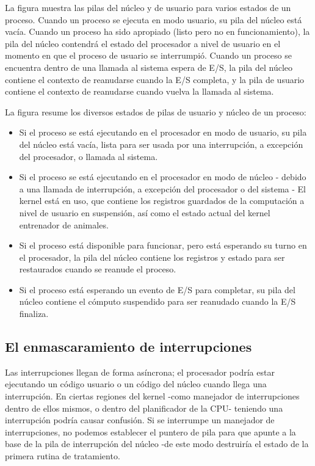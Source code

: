 \documentclass[10pt]{book}
\begin{document}
La figura muestra las pilas del núcleo y de usuario para varios estados de un proceso. Cuando un proceso se ejecuta en modo usuario, su pila del núcleo está vacía. Cuando un proceso ha sido apropiado (listo pero no en funcionamiento), la pila del núcleo contendrá el estado del procesador a nivel de usuario en el momento en que el proceso de usuario se interrumpió. Cuando un proceso se encuentra dentro de una llamada al sistema espera de E/S, la pila del núcleo contiene el contexto de reanudarse cuando la E/S completa, y la pila de usuario contiene el contexto de reanudarse cuando vuelva la llamada al sistema. 

La figura resume los diversos estados de pilas de usuario y núcleo de un proceso:
\begin{itemize}
\item Si el proceso se está ejecutando en el procesador en modo de usuario, su pila del núcleo está vacía, lista para ser usada por una interrupción, a excepción del procesador, o llamada al sistema.

\item Si el proceso se está ejecutando en el procesador en modo de núcleo - debido a una llamada de interrupción, a excepción del procesador o del sistema - El kernel está en uso, que contiene los registros guardados de la computación a nivel de usuario en suspensión, así como el estado actual del kernel entrenador de animales.

\item Si el proceso está disponible para funcionar, pero está esperando su turno en el procesador, la pila del núcleo contiene los registros y estado para ser restaurados cuando se reanude el proceso.

\item Si el proceso está esperando un evento de E/S para completar, su pila del núcleo contiene el cómputo suspendido para ser reanudado cuando la E/S finaliza.
\end{itemize}

\subsection{El enmascaramiento de interrupciones}
Las interrupciones llegan de forma asíncrona; el procesador podría estar ejecutando un código usuario o un código del núcleo cuando llega una interrupción. En ciertas regiones del kernel -como manejador de interrupciones dentro de ellos mismos, o dentro del planificador de la CPU- teniendo una interrupción podría causar confusión. Si se interrumpe un manejador de interrupciones, no podemos establecer el puntero de pila para que apunte a la base de la pila de interrupción del núcleo -de este modo destruiría el estado de la primera rutina de tratamiento.
\end{document}

